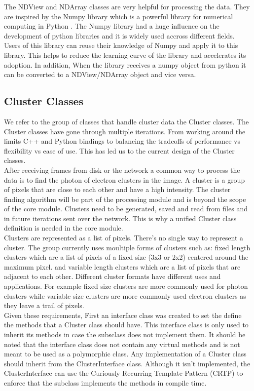 \documentclass[./chapitre3.tex]{subfiles}
\begin{document}
The NDView and NDArray classes are very helpful for processing the data. They are inspired by the Numpy library
which is a powerful library for numerical computing in Python \cite{harris2020array}. The Numpy library had a huge
influence on the development of python libraries and it is widely used accross different fields.
Users of this library can reuse their knowledge of Numpy and apply it to this library. This helps
to reduce the learning curve of the library and accelerates its adoption.
In addition, When the library receives a numpy object from python it can be converted to a NDView/NDArray object and vice versa. \\

\subsection{Cluster Classes}
We refer to the group of classes that handle cluster data the Cluster classes. The Cluster classes have gone through multiple iterations.
From working around the limits C++ and Python bindings to
balancing the tradeoffs of performance vs flexibility vs ease of use. This has led us to the current design of the Cluster classes.\\

After receiving frames from disk or the network a common way to process the data is to find the photon of electron clusters in
the image. A cluster is a group of pixels that are close to each other and have a high intensity. The cluster finding algorithm
will be part of the processing module and is beyond the scope of the core module. Clusters need to be generated, saved and read from
files and in future iterations sent over the network. This is why a unified Cluster class definition is needed in the core module.\\

Clusters are represented as a list of pixels. There's no single way to represent a cluster. The group currently uses moultiple
forms of clusters such as: fixed length clusters which are a list of pixels of a fixed size (3x3 or 2x2) centered around the maximum pixel.
and variable length clusters which are a list of pixels that are adjacent to each other. Different cluster formats have different uses and
applications. For example fixed size clusters are more commonly used for photon clusters while variable size clusters are more commonly used
electron clusters as they leave a trail of pixels.\\

Given these requirements, First an interface class was created to set the define the methods that a Cluster class should have.
This interface class is only used to inherit its methods in case the subsclass does not implement them. It should be
noted that the interface class does not contain any virtual methods and is not meant to be used as a polymorphic
class. Any implementation of a Cluster class should inherit from the ClusterInterface class. Although it isn't
implemented, the ClusterInterface can use the Curiously Recurring Template Pattern (CRTP) to enforce that the subclass
implements the methods in compile time.\\
\end{document}

